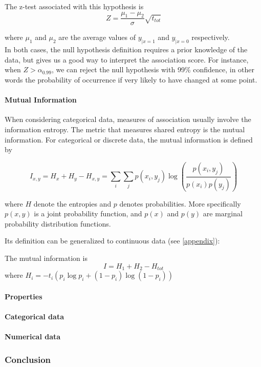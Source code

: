 \documentclass[12pt,a4paper]{article}
\begin{document}
The z-test associated with this hypothesis is
$$Z = \frac{\mu_1-\mu_2}{\sigma}\sqrt{t_{tot}}$$

where $\mu_1$ and $\mu_2$ are the average values of $y_{|x=1}$ and $y_{|x=0}$ respectively.\\

In both cases, the null hypothesis definition requires a prior knowledge of the data, but gives us a good way to interpret the association score. For instance, when $Z > \alpha_{0.99}$, we can reject the null hypothesis with 99\% confidence, in other words the probability of occurrence if very likely to have changed at some point.

\paragraph{Mutual Information}

When considering categorical data, measures of association usually involve the information entropy. The metric that measures shared entropy is the mutual information. For categorical or discrete data, the mutual information is defined by

$$I_{x,y} = H_x + H_y - H_{x, y} = \sum_i \sum_j p(x_i, y_j) \log \left( \dfrac{p(x_i, y_j)}{p(x_i) p(y_j)} \right)$$

where $H$ denote the entropies and $p$ denotes probabilities. More specifically $p(x,y)$ is a joint probability function, and $p(x)$ and $p(y)$ are marginal probability distribution functions.

Its definition can be generalized to continuous data (see \ref{appendix}):

The mutual information is 
$$I = H_1 + H_2 - H_{tot}$$
where $H_{i} = -t_{i} \left(p_{i} \log p_{i} + (1-p_{i}) \log(1-p_{i})\right)$

\paragraph{Properties}

\paragraph{Categorical data}

\paragraph{Numerical data}

\subsubsection{Conclusion}
\end{document}

